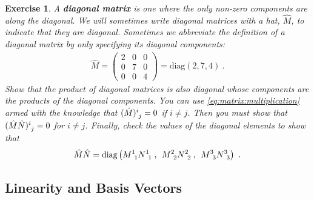 \documentclass[12pt]{article}
\newtheorem{exercise}{Exercise}[section]
\begin{document}
\begin{exercise}\label{ex:product:of:diagonal:matrices}
A \textbf{diagonal matrix} is one where the only non-zero components are along the diagonal. We will sometimes write diagonal matrices with a hat, $\hat M$, to indicate that they are diagonal. Sometimes we abbreviate the definition of a diagonal matrix by only specifying its diagonal components:
\begin{align}
    \hat M = 
    \begin{pmatrix}
        2 & 0 & 0 \\
        0 & 7 & 0 \\
        0 & 0 & 4  
    \end{pmatrix}
    =
    \text{diag}(2,7,4) \ .
\end{align}
Show that the product of diagonal matrices is also diagonal whose components are the products of the diagonal components. You can use \eqref{eq:matrix:multiplication} armed with the knowledge that $(\hat M)\aij{i}{j} = 0$ if $i\neq j$. Then you must show that $(\hat M \hat N)\aij{i}{j} = 0$ for $i\neq j$. Finally, check the values of the diagonal elements to show that
\begin{align}
    \hat M \hat N = \text{diag}\left(M\aij11 N\aij11 \;,\;\, M\aij22 N\aij 22 \;,\;\, M\aij33 N\aij 33\right) \ .
\end{align}

\end{exercise}


\subsection{Linearity and Basis Vectors}
\end{document}
